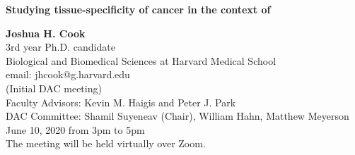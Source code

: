\begin{titlepage}
    \begin{center}
        \vspace*{1cm}
        \Huge
        \vspace{3cm}
        \textbf{Studying tissue-specificity of cancer in the context of \KRAS{}}

        \vfill
 
        \Large
        \textbf{Joshua H. Cook} \\
        3rd year Ph.D. candidate \\
        Biological and Biomedical Sciences at Harvard Medical School \\
        email: jhcook@g.harvard.edu \\
        (Initial DAC meeting) \\
        Faculty Advisors: Kevin M. Haigis and Peter J. Park \\
        DAC Committee: Shamil Suyeneav (Chair), William Hahn, Matthew Meyerson \\
        June 10, 2020 from 3pm to 5pm \\
        The meeting will be held virtually over Zoom.\\
        \vspace{2cm}
 
    \end{center}
\end{titlepage}
